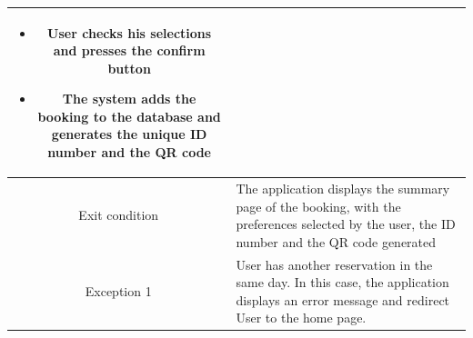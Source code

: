 \documentclass[table, 12pt]{article}
\begin{document}
\begin{longtable}{|c| p{10cm}|}
\begin{itemize}[nosep,after=\strut]
        \item User checks his selections and presses the confirm button
        \item The system adds the booking to the database and generates the unique ID number and the QR code
    \end{itemize}                                                                                                                   \\
    \hline
    Exit condition   & The application displays the summary page of the booking, with the preferences selected by the user, the ID number and the QR code generated
    \\
    \hline
    \hline
    Exception 1      & User has another reservation in the same day. In this case, the application displays an error message and redirect User to the home page.    \\
    \hline
\end{longtable}
\end{document}
